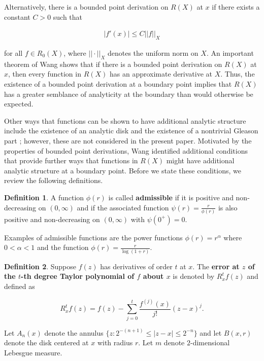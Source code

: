 \documentclass{article}
\theoremstyle{definition}
\newtheorem{definition}{Definition}
\begin{document}
\noindent Alternatively, there is a bounded point derivation on $R(X)$ at $x$ if there exists a constant $C >0$ such that

\begin{align*}
    |f'(x)| \leq C ||f||_X
\end{align*}

\noindent for all $f \in R_0(X)$, where $||\cdot||_X$ denotes the uniform norm on $X$. An important theorem of Wang \cite[Corollary 3.5]{Wang1973} shows that if there is a bounded point derivation on $R(X)$ at $x$, then every function in $R(X)$ has an approximate derivative at $X$. Thus, the existence of a bounded point derivation at a boundary point implies that $R(X)$ has a greater semblance of analyticity at the boundary than would otherwise be expected.


 Other ways that functions can be shown to have additional analytic structure include the existence of an analytic disk and the existence of a nontrivial Gleason part \cite{Cole, Ghosh}; however, these are not considered in the present paper. Motivated by the properties of bounded point derivations, Wang \cite{Wang1974} identified additional conditions that provide further ways that functions in $R(X)$ might have additional analytic structure at a boundary point. Before we state these conditions, we review the following definitions.

\begin{definition}
 A function $\phi(r)$ is called \textbf{admissible} if it is positive and non-decreasing on $(0, \infty)$ and if the associated function $\psi(r) = \frac{r}{\phi(r)}$ is also positive and non-decreasing on $(0, \infty)$ with $\psi(0^+) =0$.
 \end{definition}
 
 
 \noindent Examples of admissible functions are the power functions $\phi(r) = r^{\alpha}$ where $0<\alpha <1$ and the function $\phi(r) = \frac{r}{\log(1+r)}$.


\begin{definition}
 Suppose $f(z)$ has derivatives of order $t$ at $x$. The \textbf{error at $z$ of the $t$-th degree Taylor polynomial of $f$ about $x$} is denoted by $R_x^tf(z)$ and defined as

\begin{equation*}
    R_x^t f(z) = f(z) - \sum_{j=0}^t \dfrac{f^{(j)}(x)}{j!} (z-x)^j.
\end{equation*}
\end{definition}

\noindent Let $A_n(x)$ denote the annulus $\{z: 2^{-(n+1)} \leq \vert z-x\vert  \leq  2^{-n}\}$ and let $B(x,r)$ denote the disk centered at $x$ with radius $r$. Let $m$ denote $2$-dimensional Lebesgue measure. 
\end{document}
